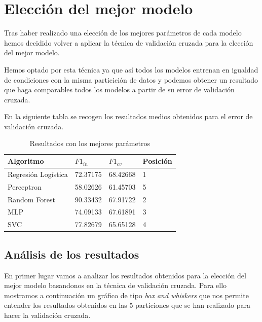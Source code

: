 \documentclass[11pt]{article}
\begin{document}
\section{Elección del mejor modelo}

Tras haber realizado una elección de los mejores parámetros de cada modelo hemos 
decidido volver a aplicar la técnica de validación cruzada para la elección del 
mejor modelo. 

Hemos optado por esta técnica ya que así todos los modelos entrenan en igualdad
de condiciones con la misma particición de datos y podemos obtener un resultado
que haga comparables todos los modelos a partir de su error de validación cruzada.

En la siguiente tabla se recogen los resultados medios obtenidos para el error de 
validación cruzada. 

\begin{table}[H]
    \centering
    \begin{tabular}{|l|l|l|l|}
    \hline
    Algoritmo    & $ F1_{in} $  & $F1_{cv}$  & Posición\\ \hline
    Regresión Logística   & 72.37175 & 68.42668 & 1 \\ \hline
    Perceptron & 58.02626 & 61.45703 & 5\\ \hline
    Random Forest   & 90.33432 & 67.91722 & 2\\ \hline
    MLP   & 74.09133  & 67.61891 & 3\\ \hline
    SVC   & 77.82679 &  65.65128 & 4\\ \hline
    \end{tabular}
    \caption{Resultados con los mejores parámetros}
\end{table}

\subsection{Análisis de los resultados}

En primer lugar vamos a analizar los resultados obtenidos para la elección del
mejor modelo basandonos en la técnica de validación cruzada. Para ello mostramos 
a continuación un gráfico de tipo \textit{box and whiskers} que nos permite entender 
los resultados obtenidos en las 5 particiones que se han realizado para hacer la validación
cruzada.
\end{document}
